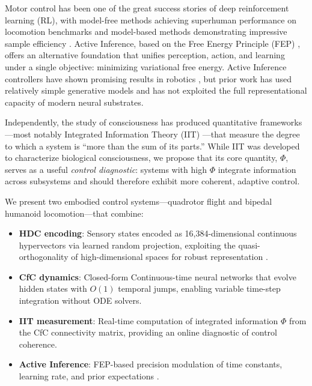 \documentclass[11pt,a4paper]{article}
\begin{document}
Motor control has been one of the great success stories of deep reinforcement learning (RL), with model-free methods achieving superhuman performance on locomotion benchmarks \citep{tassa2018deepmind, haarnoja2018soft} and model-based methods demonstrating impressive sample efficiency \citep{hafner2019dream, hafner2023mastering}.
Active Inference, based on the Free Energy Principle (FEP) \citep{friston2010free, friston2017active}, offers an alternative foundation that unifies perception, action, and learning under a single objective: minimizing variational free energy.
Active Inference controllers have shown promising results in robotics \citep{lanillos2021active, oliver2021active}, but prior work has used relatively simple generative models and has not exploited the full representational capacity of modern neural substrates.

Independently, the study of consciousness has produced quantitative frameworks---most notably Integrated Information Theory (IIT) \citep{tononi2004information, tononi2015integrated}---that measure the degree to which a system is ``more than the sum of its parts.''
While IIT was developed to characterize biological consciousness, we propose that its core quantity, $\Phi$, serves as a useful \emph{control diagnostic}: systems with high $\Phi$ integrate information across subsystems and should therefore exhibit more coherent, adaptive control.

We present two embodied control systems---quadrotor flight and bipedal humanoid locomotion---that combine:
\begin{itemize}
  \item \textbf{HDC encoding}: Sensory states encoded as 16,384-dimensional continuous hypervectors via learned random projection, exploiting the quasi-orthogonality of high-dimensional spaces for robust representation \citep{kanerva2009hyperdimensional}.
  \item \textbf{CfC dynamics}: Closed-form Continuous-time neural networks \citep{hasani2021liquid} that evolve hidden states with $O(1)$ temporal jumps, enabling variable time-step integration without ODE solvers.
  \item \textbf{IIT measurement}: Real-time computation of integrated information $\Phi$ from the CfC connectivity matrix, providing an online diagnostic of control coherence.
  \item \textbf{Active Inference}: FEP-based precision modulation of time constants, learning rate, and prior expectations \citep{friston2010free, friston2017active}.
\end{itemize}
\end{document}
